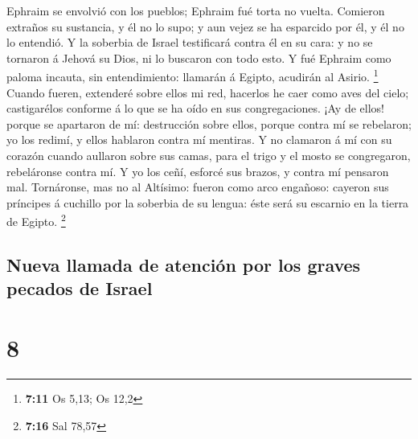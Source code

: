  Ephraim se envolvió con los pueblos; Ephraim fué torta no
vuelta.  Comieron extraños su sustancia, y él no lo supo; y
aun vejez se ha esparcido por él, y él no lo entendió.  Y
la soberbia de Israel testificará contra él en su cara: y no se tornaron
á Jehová su Dios, ni lo buscaron con todo esto.  Y fué
Ephraim como paloma incauta, sin entendimiento: llamarán á Egipto,
acudirán al Asirio. \footnote{\textbf{7:11} Os 5,13; Os 12,2}
 Cuando fueren, extenderé sobre ellos mi red, hacerlos he
caer como aves del cielo; castigarélos conforme á lo que se ha oído en
sus congregaciones.  ¡Ay de ellos! porque se apartaron de
mí: destrucción sobre ellos, porque contra mí se rebelaron; yo los
redimí, y ellos hablaron contra mí mentiras.  Y no clamaron
á mí con su corazón cuando aullaron sobre sus camas, para el trigo y el
mosto se congregaron, rebeláronse contra mí.  Y yo los
ceñí, esforcé sus brazos, y contra mí pensaron mal. 
Tornáronse, mas no al Altísimo: fueron como arco engañoso: cayeron sus
príncipes á cuchillo por la soberbia de su lengua: éste será su escarnio
en la tierra de Egipto. \footnote{\textbf{7:16} Sal 78,57}

\hypertarget{nueva-llamada-de-atenciuxf3n-por-los-graves-pecados-de-israel}{%
\subsection{Nueva llamada de atención por los graves pecados de
Israel}\label{nueva-llamada-de-atenciuxf3n-por-los-graves-pecados-de-israel}}

\hypertarget{section-7}{%
\section{8}\label{section-7}}

